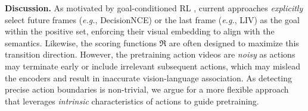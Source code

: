 \noindent\textbf{Discussion.} As motivated by goal-conditioned RL \cite{nips17-her}, current approaches \textit{explicitly} select future frames (\textit{e.g.}, DecisionNCE) or the last frame (\textit{e.g.}, LIV) as the goal within the positive set, enforcing their visual embedding to align with the semantics. Likewise, the scoring functions $\mathfrak{R}$ are often designed to maximize this transition direction. However, the pretraining action videos are \textit{noisy} as actions may terminate early or include irrelevant subsequent actions, which may mislead the encoders and result in inaccurate vision-language association. As detecting precise action boundaries is non-trivial, we argue for a more flexible approach that leverages \textit{intrinsic} characteristics of actions to guide pretraining.








